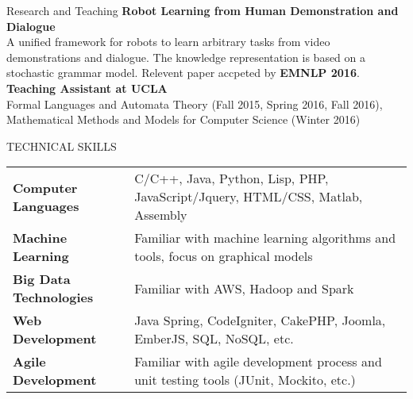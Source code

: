 \documentclass{resume} %
\begin{document}

\begin{rSection}{Research and Teaching}
\textbf{Robot Learning from Human Demonstration and Dialogue}\\
A unified framework for robots to learn arbitrary tasks from video demonstrations and dialogue. The knowledge representation is based on a stochastic grammar model. Relevent paper accpeted by \textbf{EMNLP 2016}.\\
\textbf{Teaching Assistant at UCLA}\\  
Formal Languages and Automata Theory (Fall 2015, Spring 2016, Fall 2016), Mathematical Methods and Models for Computer Science (Winter 2016)
\end{rSection}



\begin{rSection}{TECHNICAL SKILLS}

\begin{tabular}{ @{} >{\bfseries}l @{\hspace{6ex}} l }
Computer Languages & C/C++, Java, Python, Lisp, PHP, JavaScript/Jquery, HTML/CSS, Matlab, Assembly \\
Machine Learning & Familiar with machine learning algorithms and tools, focus on graphical models \\
Big Data Technologies & Familiar with AWS, Hadoop and Spark \\
Web Development & Java Spring, CodeIgniter, CakePHP, Joomla, EmberJS, SQL, NoSQL, etc. \\
Agile Development & Familiar with agile development process and unit testing tools (JUnit, Mockito, etc.) \\
\end{tabular}
\end {rSection}


\end{document}

